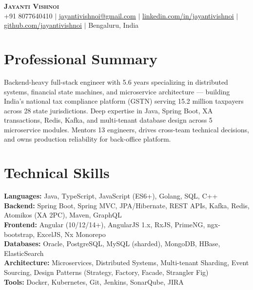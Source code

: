 \documentclass[letterpaper,11pt]{article}
\begin{document}
\begin{center}
    \textbf{\Huge \scshape Jayanti Vishnoi} \\ \vspace{4pt}
    \small +91 8077640410 $|$
    \href{mailto:jayantivishnoi@gmail.com}{\underline{jayantivishnoi@gmail.com}} $|$
    \href{https://linkedin.com/in/jayantivishnoi}{\underline{linkedin.com/in/jayantivishnoi}} $|$
    \href{https://github.com/jayantivishnoi}{\underline{github.com/jayantivishnoi}} $|$
    Bengaluru, India
\end{center}

\section{Professional Summary}
\small{
Backend-heavy full-stack engineer with 5.6 years specializing in distributed systems, financial state machines, and microservice architecture — building India's national tax compliance platform (GSTN) serving 15.2 million taxpayers across 28 state jurisdictions. Deep expertise in Java, Spring Boot, XA transactions, Redis, Kafka, and multi-tenant database design across 5 microservice modules. Mentors 13 engineers, drives cross-team technical decisions, and owns production reliability for back-office platform.
}

\section{Technical Skills}
\begin{itemize}[leftmargin=0.15in, label={}]
    \small{\item{
     \textbf{Languages:} Java, TypeScript, JavaScript (ES6+), Golang, SQL, C++ \\
     \textbf{Backend:} Spring Boot, Spring MVC, JPA/Hibernate, REST APIs, Kafka, Redis, Atomikos (XA 2PC), Maven, GraphQL \\
     \textbf{Frontend:} Angular (10/12/14+), AngularJS 1.x, RxJS, PrimeNG, ngx-bootstrap, ExcelJS, Nx Monorepo \\
     \textbf{Databases:} Oracle, PostgreSQL, MySQL (sharded), MongoDB, HBase, ElasticSearch \\
     \textbf{Architecture:} Microservices, Distributed Systems, Multi-tenant Sharding, Event Sourcing, Design Patterns (Strategy, Factory, Facade, Strangler Fig) \\
     \textbf{Tools:} Docker, Kubernetes, Git, Jenkins, SonarQube, JIRA \\
    }}
\end{itemize}
\end{document}
